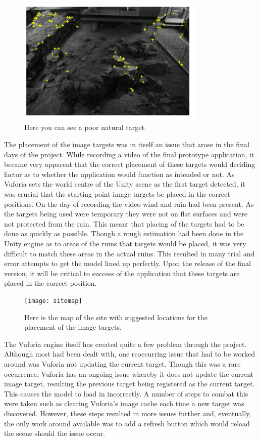 \begin{figure}[ht!]
	\centering
	\includegraphics[width=90mm]{badTarget}
	\caption{Here you can see a poor natural target.
		\label{overflow}}
\end{figure}
The placement of the image targets was in itself an issue that arose in the final days of the project. While recording a video of the final prototype application, it became very apparent that the correct placement of these targets would deciding factor as to whether the application would function as intended or not. As Vuforia sets the world centre of the Unity scene as the first target detected, it was crucial that the starting point image targets be placed in the correct positions. On the day of recording the video wind and rain had been present. As the targets being used were temporary they were not on flat surfaces and were not protected from the rain. This meant that placing of the targets had to be done as quickly as possible. Though a rough estimation had been done in the Unity engine as to areas of the ruins that targets would be placed, it was very difficult to match these areas in the actual ruins. This resulted in many trial and error attempts to get the model lined up perfectly. Upon the release of the final version, it will be critical to success of the application that these targets are placed in the correct position.

\begin{figure}[ht!]
	\centering
	\texttt{[image: sitemap]}
	\caption{Here is the map of the site with suggested locations for the placement of the image targets.
		\label{overflow}}
\end{figure}

The Vuforia engine itself has created quite a few problem through the project. Although most had been dealt with, one reoccurring issue that had to be worked around was Vuforia not updating the current target. Though this was a rare occurrence, Vuforia has an ongoing issue whereby it does not update the current image target, resulting the previous target being registered as the current target. This causes the model to load in incorrectly. A number of steps to combat this were taken such as clearing Vuforia's image cache each time a new target was discovered. However, these steps resulted in more issues further and, eventually, the only work around available was to add a refresh button which would reload the scene should the issue occur.

